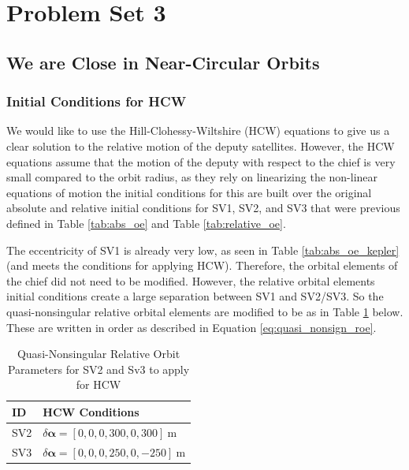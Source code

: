 \section{Problem Set 3}
\subsection{We are Close in Near-Circular Orbits}

\subsubsection{Initial Conditions for HCW}

We would like to use the Hill-Clohessy-Wiltshire (HCW) equations to give us a clear solution to the relative motion of the deputy satellites. However, the HCW equations assume that the motion of the deputy with respect to the chief is very small compared to the orbit radius, as they rely on linearizing the non-linear equations of motion the initial conditions for this are built over the original absolute and relative initial conditions for SV1, SV2, and SV3 that were previous defined in Table \ref{tab:abs_oe} and Table \ref{tab:relative_oe}.

The eccentricity of SV1 is already very low, as seen in Table \ref{tab:abs_oe_kepler} (and meets the conditions for applying HCW). Therefore, the orbital elements of the chief did not need to be modified. However, the relative orbital elements initial conditions create a large separation between SV1 and SV2/SV3. So the quasi-nonsingular relative orbital elements are modified to be as in Table \ref{tab:relative_oe_hcw} below. These are written in order as described in Equation \ref{eq:quasi_nonsign_roe}.

\begin{table}[h!]
\centering
\begin{tabular}{ll}
\toprule
\textbf{ID} & \textbf{HCW Conditions} \\
\midrule
SV2 & $\delta\boldsymbol{\alpha} = [0, 0, 0, 300, 0, 300]~\text{m}$ \\
SV3 & $\delta\boldsymbol{\alpha} = [0, 0, 0, 250, 0, -250]~\text{m}$ \\
\bottomrule
\end{tabular}
\caption{Quasi-Nonsingular Relative Orbit Parameters for SV2 and Sv3 to apply for HCW}
\label{tab:relative_oe_hcw}
\end{table}

